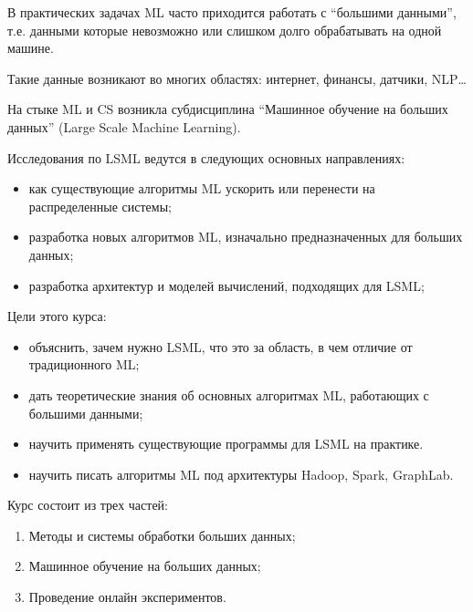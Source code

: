 В практических задачах ML часто приходится работать с “большими данными”, т.е. данными которые невозможно или слишком долго обрабатывать на одной машине. \newline

Такие данные возникают во многих областях: интернет, финансы, датчики, NLP… \newline

На стыке ML и CS возникла субдисциплина “Машинное обучение на больших данных” (Large Scale Machine Learning). \newline

Исследования по LSML ведутся в следующих основных направлениях:
\begin{itemize}
    \item как существующие алгоритмы ML ускорить или перенести на распределенные системы;
    \item разработка новых алгоритмов ML, изначально предназначенных для больших данных;
    \item разработка архитектур и моделей вычислений, подходящих для LSML;
\end{itemize}
$ $\\ 
Цели этого курса:
\begin{itemize}
    \item объяснить, зачем нужно LSML, что это за область, в чем отличие от традиционного ML;
    \item дать теоретические знания об основных алгоритмах ML, работающих с большими данными;
    \item научить применять существующие программы для LSML на практике.
    \item научить писать алгоритмы ML под архитектуры Hadoop, Spark, GraphLab.
\end{itemize}
$ $\\ 
Курс состоит из трех частей:
\begin{enumerate}
    \item Методы и системы обработки больших данных;
    \item Машинное обучение на больших данных;
    \item Проведение онлайн экспериментов.
\end{enumerate}